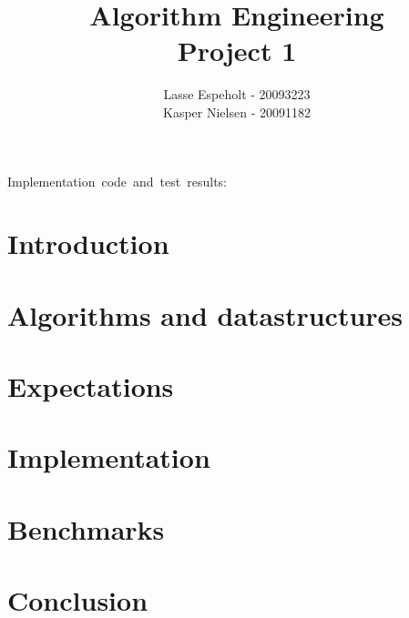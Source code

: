 \documentclass[a4paper]{article}
\begin{document}
\title{Algorithm Engineering\\Project 1}


\author{Lasse Espeholt - 20093223\\
Kasper Nielsen - 20091182}

\maketitle
\vfill{}

\begin{description}
\item [{Implementation~code~and~test~results:}] %
\end{description}
\pagebreak{}\tableofcontents{}\pagebreak{}


\section{Introduction}


	
\section{Algorithms and datastructures}



\section{Expectations}



\section{Implementation}



\section{Benchmarks}



\section{Conclusion}


\end{document}
